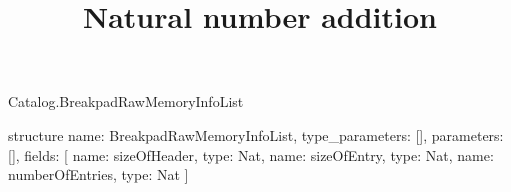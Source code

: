 \begin{lexlean}{Catalog.BreakpadRawMemoryInfoList}
\title{Natural number addition}
\begin{semanticmodule}
structure{
  name: BreakpadRawMemoryInfoList,
  type_parameters: [],
  parameters: [],
  fields: [
    {name: sizeOfHeader, type: Nat},
    {name: sizeOfEntry, type: Nat},
    {name: numberOfEntries, type: Nat}
  ]
}
\end{semanticmodule}
\end{lexlean}
